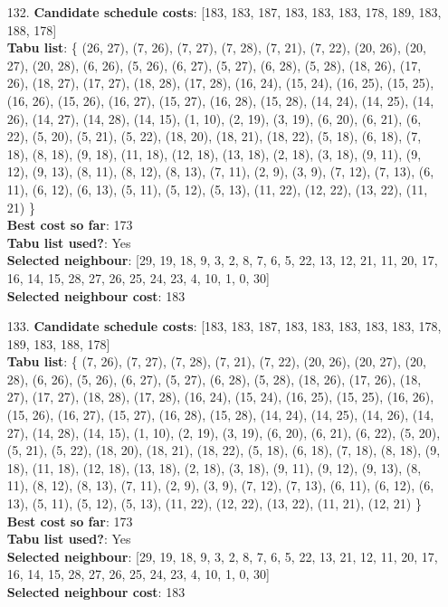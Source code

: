 \documentclass[fleqn]{article}
\begin{document}
\begin{itemize}
    \item[132.] \textbf{Candidate schedule costs}: [183, 183, 187, 183, 183, 183, 178, 189, 183, 188, 178] \\
    \textbf{Tabu list}: \{ (26, 27), (7, 26), (7, 27), (7, 28), (7, 21), (7, 22), (20, 26), (20, 27), (20, 28), (6, 26), (5, 26), (6, 27), (5, 27), (6, 28), (5, 28), (18, 26), (17, 26), (18, 27), (17, 27), (18, 28), (17, 28), (16, 24), (15, 24), (16, 25), (15, 25), (16, 26), (15, 26), (16, 27), (15, 27), (16, 28), (15, 28), (14, 24), (14, 25), (14, 26), (14, 27), (14, 28), (14, 15), (1, 10), (2, 19), (3, 19), (6, 20), (6, 21), (6, 22), (5, 20), (5, 21), (5, 22), (18, 20), (18, 21), (18, 22), (5, 18), (6, 18), (7, 18), (8, 18), (9, 18), (11, 18), (12, 18), (13, 18), (2, 18), (3, 18), (9, 11), (9, 12), (9, 13), (8, 11), (8, 12), (8, 13), (7, 11), (2, 9), (3, 9), (7, 12), (7, 13), (6, 11), (6, 12), (6, 13), (5, 11), (5, 12), (5, 13), (11, 22), (12, 22), (13, 22), (11, 21) \} \\
    \textbf{Best cost so far}: 173 \\
    \textbf{Tabu list used?}: Yes \\
    \textbf{Selected neighbour}: [29, 19, 18, 9, 3, 2, 8, 7, 6, 5, 22, 13, 12, 21, 11, 20, 17, 16, 14, 15, 28, 27, 26, 25, 24, 23, 4, 10, 1, 0, 30] \\
    \textbf{Selected neighbour cost}: 183
      

    \item[133.] \textbf{Candidate schedule costs}: [183, 183, 187, 183, 183, 183, 183, 183, 178, 189, 183, 188, 178] \\
    \textbf{Tabu list}: \{ (7, 26), (7, 27), (7, 28), (7, 21), (7, 22), (20, 26), (20, 27), (20, 28), (6, 26), (5, 26), (6, 27), (5, 27), (6, 28), (5, 28), (18, 26), (17, 26), (18, 27), (17, 27), (18, 28), (17, 28), (16, 24), (15, 24), (16, 25), (15, 25), (16, 26), (15, 26), (16, 27), (15, 27), (16, 28), (15, 28), (14, 24), (14, 25), (14, 26), (14, 27), (14, 28), (14, 15), (1, 10), (2, 19), (3, 19), (6, 20), (6, 21), (6, 22), (5, 20), (5, 21), (5, 22), (18, 20), (18, 21), (18, 22), (5, 18), (6, 18), (7, 18), (8, 18), (9, 18), (11, 18), (12, 18), (13, 18), (2, 18), (3, 18), (9, 11), (9, 12), (9, 13), (8, 11), (8, 12), (8, 13), (7, 11), (2, 9), (3, 9), (7, 12), (7, 13), (6, 11), (6, 12), (6, 13), (5, 11), (5, 12), (5, 13), (11, 22), (12, 22), (13, 22), (11, 21), (12, 21) \} \\
    \textbf{Best cost so far}: 173 \\
    \textbf{Tabu list used?}: Yes \\
    \textbf{Selected neighbour}: [29, 19, 18, 9, 3, 2, 8, 7, 6, 5, 22, 13, 21, 12, 11, 20, 17, 16, 14, 15, 28, 27, 26, 25, 24, 23, 4, 10, 1, 0, 30] \\
    \textbf{Selected neighbour cost}: 183
      


\end{itemize}
\end{document}
